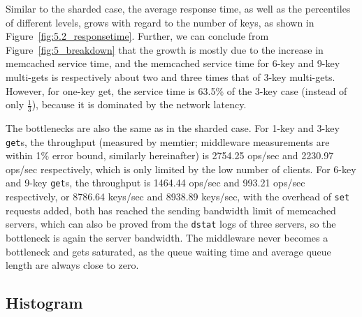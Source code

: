 Similar to the sharded case, the average response time, as well as the percentiles of different levels, grows with regard to the number of keys, as shown in Figure~\ref{fig:5.2_responsetime}. Further, we can conclude from Figure~\ref{fig:5_breakdown} that the growth is mostly due to the increase in memcached service time, and the memcached service time for 6-key and 9-key multi-gets is respectively about two and three times that of 3-key multi-gets. However, for one-key get, the service time is 63.5\% of the 3-key case (instead of only $\frac{1}{3}$), because it is dominated by the network latency.


The bottlenecks are also the same as in the sharded case. For 1-key and 3-key \texttt{get}s, the throughput (measured by memtier; middleware measurements are within 1\% error bound, similarly hereinafter) is 2754.25 ops/sec and 2230.97 ops/sec respectively, which is only limited by the low number of clients. For 6-key and 9-key \texttt{get}s, the throughput is 1464.44 ops/sec and 993.21 ops/sec respectively, or 8786.64 keys/sec and 8938.89 keys/sec, with the overhead of \texttt{set} requests added, both has reached the sending bandwidth limit of memcached servers, which can also be proved from the \texttt{dstat} logs of three servers, so the bottleneck is again the server bandwidth. The middleware never becomes a bottleneck and gets saturated, as the queue waiting time and average queue length are always close to zero.


\subsection{Histogram}

